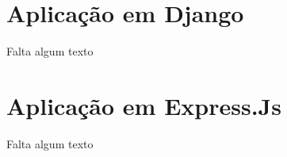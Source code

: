 \section{Aplicação em Django}
\label{desenvolvimento-django}

  Falta algum texto

\section{Aplicação em Express.Js}
\label{escopo-projeto}

  Falta algum texto
